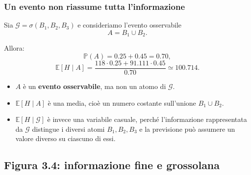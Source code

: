 \documentclass[handout]{beamer}%
\newenvironment{stepitemize}{\begin{itemize}[<+->]}{\end{itemize} }
\providecommand{\E}{\mathbb{E}}
\providecommand{\Prob}{\mathbb{P}}
\providecommand{\G}{\mathcal{G}}
\providecommand{\1}{\mathbf{1}}
\providecommand{\QTR}[2]{\csname #1\endcsname{#2}}
\begin{document}
\begin{frame}%
%

\frametitle{Un evento non riassume tutta l'informazione}%
%

%


Sia $\G=\sigma(B_{1},B_{2},B_{3})$ e consideriamo l'evento osservabile
\[
A=B_{1}\cup B_{2}.
\]


\medskip

Allora:
\[
\Prob(A)=0.25+0.45=0.70,
\]
\[
\E[H\mid A] = \frac{118\cdot0.25+91.111\cdot0.45}{0.70} \simeq100.714.
\]


\medskip

\begin{stepitemize}
\item $A$ \`{e} un \textbf{evento osservabile}, ma non un atomo di $\G$.

\item $\E[H\mid A]$ \`{e} una media, cio\`{e} un numero costante sull'unione
$B_{1}\cup B_{2}$.

\item $\E[H\mid\G]$ \`{e} invece una variabile casuale, perch\'e
l'informazione rappresentata da $\G$ distingue i diversi atomi $B_{1}%
,B_{2},B_{3}$ e la previsione pu\`{o} assumere un valore diverso su ciascuno
di essi.
\end{stepitemize}%

\transboxout
\end{frame}%


\subsection{Figura 3.4: informazione fine e grossolana}%
\end{document}
